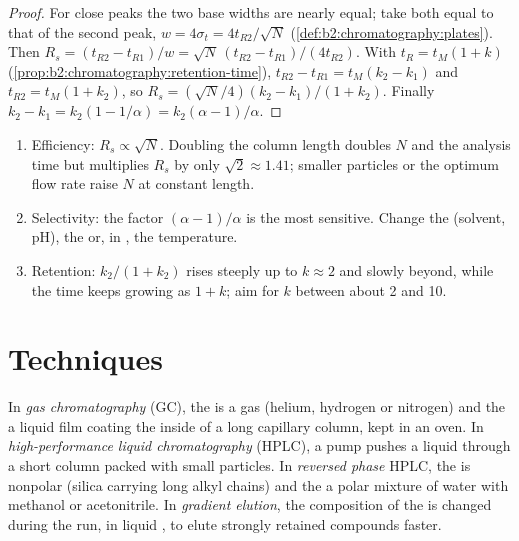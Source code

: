 \begin{proof}
For close peaks the two base widths are nearly equal; take both equal to that of the second peak,
$w = 4\sigma_t = 4t_{R2}/\sqrt N$ (\cref{def:b2:chromatography:plates}). Then $R_s = (t_{R2} -
t_{R1})/w = \sqrt N\,(t_{R2} - t_{R1})/(4t_{R2})$. With $t_R = t_M(1 + k)$
(\cref{prop:b2:chromatography:retention-time}), $t_{R2} - t_{R1} = t_M(k_2 - k_1)$ and $t_{R2} =
t_M(1 + k_2)$, so $R_s = (\sqrt N/4)(k_2 - k_1)/(1 + k_2)$. Finally $k_2 - k_1 = k_2(1 - 1/\alpha) =
k_2(\alpha - 1)/\alpha$.
\end{proof}

\begin{method}\label{met:b2:chromatography:improve-resolution}
\begin{enumerate}
  \item Efficiency: $R_s \propto \sqrt N$. Doubling the column length doubles $N$ and the analysis time
        but multiplies $R_s$ by only $\sqrt2 \approx 1.41$; smaller particles or the optimum flow rate
        raise $N$ at constant length.
  \item Selectivity: the factor $(\alpha - 1)/\alpha$ is the most sensitive. Change the 
        (solvent, pH), the  or, in , the temperature.
  \item Retention: $k_2/(1+k_2)$ rises steeply up to $k \approx 2$ and slowly beyond, while the time
        keeps growing as $1 + k$; aim for $k$ between about 2 and 10.
\end{enumerate}
\end{method}

\section{Techniques}

\begin{definition}\label{def:b2:chromatography:techniques}
In \emph{gas chromatography} (GC), the  is a gas (helium, hydrogen
or nitrogen) and the  a liquid film coating the inside of a long capillary column, kept
in an oven. In \emph{high-performance liquid chromatography}
(HPLC), a pump pushes a liquid  through a short column packed with small
particles. In \emph{reversed phase} HPLC, the  is nonpolar
(silica carrying long alkyl chains) and the  a polar mixture of water with methanol or
acetonitrile. In \emph{gradient elution}, the composition of the  is
changed during the run, in liquid , to elute strongly retained compounds faster.
\end{definition}

